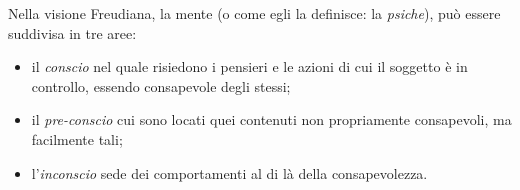 \documentclass{subfiles}
\begin{document}
Nella visione Freudiana, la mente (o come egli la definisce: la \emph{psiche}), può essere suddivisa in tre aree:
\begin{itemize}
    \item il \emph{conscio} nel quale risiedono i pensieri e le azioni di cui il soggetto è in controllo, essendo consapevole degli stessi;
    \item il \emph{pre-conscio} cui sono locati quei contenuti non propriamente consapevoli, ma facilmente tali;
    \item l'\emph{inconscio} sede dei comportamenti al di là della consapevolezza.
\end{itemize}
\end{document}
